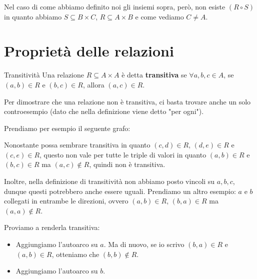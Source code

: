 \documentclass[12pt]{report}
\begin{document}
	Nel caso di come abbiamo definito noi gli insiemi sopra, però, non esiste $(R \circ S)$ in quanto abbiamo $S \subseteq B \times C$, $R \subseteq A \times B$ e come vediamo $C \neq A$.
	
	\section{Proprietà delle relazioni}
	
	\begin{definizione}{Transitività}{}
		Una relazione $R \subseteq A \times A$ è detta \textbf{transitiva} se $\forall a, b, c \in A$, se $(a, b) \in R$ e $(b, c) \in R$, allora $(a, c) \in R$.
	\end{definizione}
	
	Per dimostrare che una relazione non è transitiva, ci basta trovare anche un solo controesempio (dato che nella definizione viene detto "per ogni").
	
	Prendiamo per esempio il seguente grafo:
	
	\begin{center}
	\end{center}
	
	Nonostante possa sembrare transitiva in quanto $(c, d) \in R$, $(d, e) \in R$ e $(c, e) \in R$, questo non vale per tutte le triple di valori in quanto $(a, b) \in R$ e $(b, c) \in R$ ma $(a, c) \notin R$, quindi non è transitiva.
	
	Inoltre, nella definizione di transitività non abbiamo posto vincoli su $a, b, c$, dunque questi potrebbero anche essere uguali. 
	Prendiamo un altro esempio: $a$ e $b$ collegati in entrambe le direzioni, ovvero $(a, b) \in R$, $(b, a) \in R$ ma $(a, a) \notin R$.
	
	Proviamo a renderla transitiva:
	\begin{itemize}
		\item Aggiungiamo l'autoarco su $a$. Ma di nuovo, se io scrivo $(b, a) \in R$ e $(a, b) \in R$, otteniamo che $(b, b) \notin R$.
		\item Aggiungiamo l'autoarco su $b$.
	\end{itemize}
	
\end{document}
